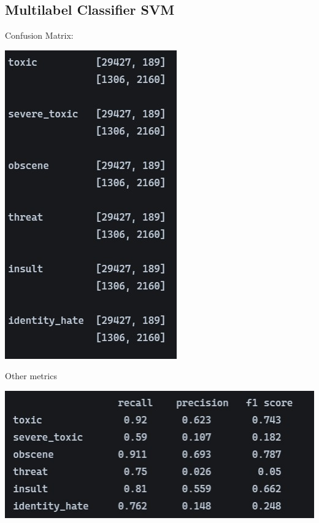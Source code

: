 \documentclass[11pt]{article}
\begin{document}
\subsection{Multilabel Classifier SVM}
Confusion Matrix:
\begin{center}
	\includegraphics[scale=0.75]{figs/conf_mSVM.jpeg}
\end{center}
Other metrics
\begin{center}
	\includegraphics[scale=0.75]{figs/rpf_mSVM.jpeg}	
\end{center}
\end{document}
